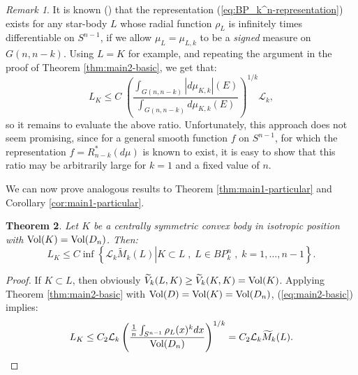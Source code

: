 \documentclass[12pt,oneside]{amsart}
\newtheorem{thm}{Theorem}[section] %
\theoremstyle{definition}
\theoremstyle{remark}
\newtheorem{rem}[thm]{Remark}
\theoremstyle{proof}
\numberwithin{equation}{section}
\newcommand{\abs}[1]{\left\vert#1\right\vert}
\newcommand{\set}[1]{\left\{#1\right\}}
\newcommand{\brac}[1]{\left(#1\right)}
\newcommand{\BP}{BP}
\renewcommand{\MR}{\widetilde{M}} %
\renewcommand{\L}{\mathcal{L}}
\newcommand{\Lk}{\mathcal{L}_k}
\newcommand{\Vol}[1]{\textnormal{Vol} (#1)}
\newcommand{\VolRatio}[2]{\brac{\frac{\Vol{#1}}{\Vol{#2}}}^{1/n}}
\begin{document}
\begin{rem}
It is known (\cite{Koldobsky-I-equal-BP}) that the representation
(\ref{eq:BP_k^n-representation}) exists for any star-body $L$
whose radial function $\rho_L$ is infinitely times differentiable
on $S^{n-1}$, if we allow $\mu_L = \mu_{L,k}$ to be a
\emph{signed} measure on $G(n,n-k)$. Using $L=K$ for example, and
repeating the argument in the proof of Theorem
\ref{thm:main2-basic}, we get that:
\[
L_K \leq C \; \brac{\frac{\int_{G(n,n-k)} \abs{d\mu_{K,k}}(E)}
{\int_{G(n,n-k)} d\mu_{K,k}(E)}}^{1/k} \L_k,
\]
so it remains to evaluate the above ratio. Unfortunately, this
approach does not seem promising, since for a general smooth
function $f$ on $S^{n-1}$, for which the representation $f =
R_{n-k}^*(d\mu)$ is known to exist, it is easy to show that this
ratio may be arbitrarily large for $k=1$ and a fixed value of $n$.
\end{rem}

\medskip

We can now prove analogous results to Theorem
\ref{thm:main1-particular} and Corollary
\ref{cor:main1-particular}.


\begin{thm} \label{thm:main2-particular}
Let $K$ be a centrally symmetric convex body in isotropic
position with $\Vol{K}=\Vol{D_n}$. Then:
\[
L_K \leq C \inf \set{\left . \L_k \MR_k(L)  \right | K \subset L
\; , \; L \in \BP_k^n \; , \; k=1,\ldots,n-1}.
\]
\end{thm}
\begin{proof}
If $K \subset L$, then obviously $\widetilde{V}_{k}(L,K) \geq
\widetilde{V}_{k}(K,K) = \Vol{K}$. Applying Theorem
\ref{thm:main2-basic} with $\Vol{D} = \Vol{K} = \Vol{D_n}$,
(\ref{eq:main2-basic}) implies:
\begin{equation} \label{eq:main2-particular}
L_K \leq C_2 \Lk \brac{\frac{\frac{1}{n} \int_{S^{n-1}}
\rho_L(x)^{k} dx}{\Vol{D_n}}}^{1/k}  = C_2 \Lk \MR_k(L).
\end{equation}
\end{proof}
\end{document}
